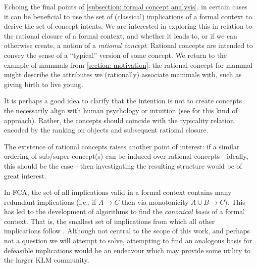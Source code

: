 Echoing the final points of \cref{subsection: formal concept analysis}, in certain cases it can be beneficial to use the set of (classical) implications of a formal context to derive the set of concept intents. We are interested in exploring this in relation to the rational closure of a formal context, and whether it leads to, or if we can otherwise create, a notion of a \textit{rational concept}. Rational concepts are intended to convey the sense of a ``typical'' version of some concept. We return to the example of mammals from \cref{section: motivation}: the rational concept for mammal might describe the attributes we (rationally) associate mammals with, such as giving birth to live young.

It is perhaps a good idea to clarify that the intention is not to create concepts the necessarily align with human psychology or intuition (see \cite{belohlavek2012basic} for this kind of approach). Rather, the concepts should coincide with the typicality relation encoded by the ranking on objects and subsequent rational closure.

The existence of rational concepts raises another point of interest: if a similar ordering of sub/super concept(s) can be induced over rational concepts—ideally, this should be the case—then investigating the resulting structure would be of great interest.

In FCA, the set of all implications valid in a formal context contains many redundant implications (i.e., if $A \rightarrow C$ then via monotonicity $A \cup B \rightarrow C$). This has led to the development of algorithms to find the \textit{canonical basis} of a formal context. That is, the smallest set of implications from which all other implications follow \cite{ganter2016conceptual}. Although not central to the scope of this work, and perhaps not a question we will attempt to solve, attempting to find an analogous basis for defeasible implications would be an endeavour which may provide some utility to the larger KLM community.

